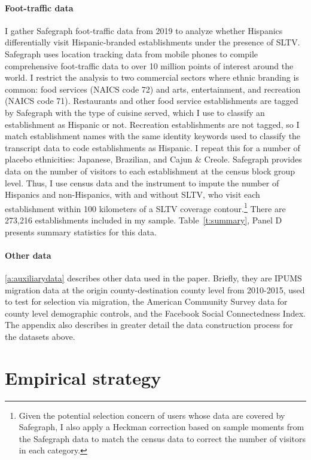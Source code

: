 \documentclass[11pt]{article}
\begin{document}
\paragraph{Foot-traffic data} I gather Safegraph foot-traffic data from 2019 to analyze whether Hispanics differentially visit Hispanic-branded establishments under the presence of SLTV. Safegraph uses location tracking data from mobile phones to compile comprehensive foot-traffic data to over 10 million points of interest around the world. I restrict the analysis to two commercial sectors where ethnic branding is common: food services (NAICS code 72) and arts, entertainment, and recreation (NAICS code 71). Restaurants and other food service establishments are tagged by Safegraph with the type of cuisine served, which I use to classify an establishment as Hispanic or not. Recreation establishments are not tagged, so I match establishment names with the same identity keywords used to classify the transcript data to code establishments as Hispanic. I repeat this for a number of placebo ethnicities: Japanese, Brazilian, and Cajun \& Creole. Safegraph provides data on the number of visitors to each establishment at the census block group level. Thus, I use census data and the instrument to impute the number of Hispanics and non-Hispanics, with and without SLTV, who visit each establishment within 100 kilometers of a SLTV coverage contour.\footnote{ Given the potential selection concern of users whose data are covered by Safegraph, I also apply a Heckman correction based on sample moments from the Safegraph data to match the census data to correct the number of visitors in each category.} There are 273,216 establishments included in my sample. Table~\ref{t:summary}, Panel D presents summary statistics for this data. 

\paragraph{Other data} \ref{a:auxiliarydata} describes other data used in the paper. Briefly, they are IPUMS migration data at the origin county-destination county level from 2010-2015, used to test for selection via migration, the American Community Survey data for county level demographic controls, and the Facebook Social Connectedness Index. The appendix also describes in greater detail the data construction process for the datasets above.



\section{Empirical strategy}\label{s:rd}
\end{document}

